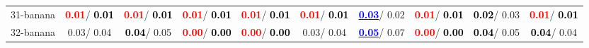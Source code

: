 \begin{table}[h]
\begin{center}
{\begin{tabular}{lc|c|c|c|c|c|c|c|c}
31-banana & \textcolor{red}{\textbf{  0.01}}/\textcolor{black}{\textbf{  0.01}} & \textcolor{red}{\textbf{  0.01}}/\textcolor{black}{\textbf{  0.01}} & \textcolor{red}{\textbf{  0.01}}/\textcolor{black}{\textbf{  0.01}} & \textcolor{red}{\textbf{  0.01}}/\textcolor{black}{\textbf{  0.01}} & \textcolor{red}{\textbf{  0.01}}/\textcolor{black}{\textbf{  0.01}} & \underline{\textcolor{blue}{\textbf{  0.03}}}/  0.02 & \textcolor{red}{\textbf{  0.01}}/\textcolor{black}{\textbf{  0.01}} & \textcolor{black}{\textbf{  0.02}}/  0.03 & \textcolor{red}{\textbf{  0.01}}/\textcolor{black}{\textbf{  0.01}} \\
32-banana &   0.03/  0.04 & \textcolor{black}{\textbf{  0.04}}/  0.05 & \textcolor{red}{\textbf{  0.00}}/\textcolor{black}{\textbf{  0.00}} & \textcolor{red}{\textbf{  0.00}}/\textcolor{black}{\textbf{  0.00}} &   0.03/  0.04 & \underline{\textcolor{blue}{\textbf{  0.05}}}/  0.07 & \textcolor{red}{\textbf{  0.00}}/\textcolor{black}{\textbf{  0.00}} & \textcolor{black}{\textbf{  0.04}}/  0.05 & \textcolor{black}{\textbf{  0.04}}/  0.04 \\\end{tabular}}\label{stratsALCKappa0AllReduxhalfa}
\end{center}
\end{table}
